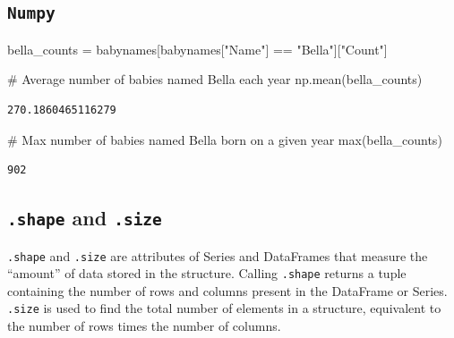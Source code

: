 \documentclass[
  letterpaper,
  DIV=11,
  numbers=noendperiod]{scrreprt}
\newenvironment{Shaded}{\begin{snugshade}}{\end{snugshade}}
\newcommand{\BuiltInTok}[1]{\textcolor[rgb]{0.00,0.23,0.31}{#1}}
\newcommand{\CommentTok}[1]{\textcolor[rgb]{0.37,0.37,0.37}{#1}}
\newcommand{\NormalTok}[1]{\textcolor[rgb]{0.00,0.23,0.31}{#1}}
\newcommand{\OperatorTok}[1]{\textcolor[rgb]{0.37,0.37,0.37}{#1}}
\newcommand{\StringTok}[1]{\textcolor[rgb]{0.13,0.47,0.30}{#1}}
\begin{document}
\hypertarget{numpy}{%
\subsection{\texorpdfstring{\texttt{Numpy}}{Numpy}}\label{numpy}}

\begin{Shaded}
\begin{Highlighting}[]
\NormalTok{bella\_counts }\OperatorTok{=}\NormalTok{ babynames[babynames[}\StringTok{"Name"}\NormalTok{] }\OperatorTok{==} \StringTok{"Bella"}\NormalTok{][}\StringTok{"Count"}\NormalTok{]}
\end{Highlighting}
\end{Shaded}

\begin{Shaded}
\begin{Highlighting}[]
\CommentTok{\# Average number of babies named Bella each year}
\NormalTok{np.mean(bella\_counts)}
\end{Highlighting}
\end{Shaded}

\begin{verbatim}
270.1860465116279
\end{verbatim}

\begin{Shaded}
\begin{Highlighting}[]
\CommentTok{\# Max number of babies named Bella born on a given year}
\BuiltInTok{max}\NormalTok{(bella\_counts)}
\end{Highlighting}
\end{Shaded}

\begin{verbatim}
902
\end{verbatim}

\hypertarget{shape-and-.size}{%
\subsection{\texorpdfstring{\texttt{.shape} and
\texttt{.size}}{.shape and .size}}\label{shape-and-.size}}

\texttt{.shape} and \texttt{.size} are attributes of Series and
DataFrames that measure the ``amount'' of data stored in the structure.
Calling \texttt{.shape} returns a tuple containing the number of rows
and columns present in the DataFrame or Series. \texttt{.size} is used
to find the total number of elements in a structure, equivalent to the
number of rows times the number of columns.
\end{document}
